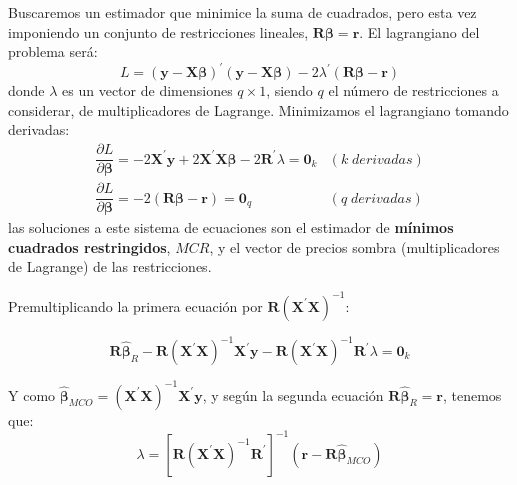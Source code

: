 Buscaremos un estimador que minimice la suma de cuadrados, pero esta
vez imponiendo un conjunto de restricciones lineales, $\boldsymbol{R}\boldsymbol{\beta}=\boldsymbol{r}$.
El lagrangiano del problema ser\'a:
\[
L=\left(\boldsymbol{y}-\boldsymbol{X}\boldsymbol{\beta}\right)^{\prime}\left(\boldsymbol{y}-\boldsymbol{X}\boldsymbol{\beta}\right)-2\lambda^{\prime}\left(\boldsymbol{R}\boldsymbol{\beta}-\boldsymbol{r}\right)
\]
 donde $\lambda$ es un vector de dimensiones $q\times1$, siendo
$q$ el n\'umero de restricciones a considerar, de multiplicadores de
Lagrange. Minimizamos el lagrangiano tomando derivadas:
\[
\begin{array}{cc}
\dfrac{\partial L}{\partial\boldsymbol{\beta}}=-2\boldsymbol{X}^{\prime}\boldsymbol{y}+2\boldsymbol{X}^{\prime}\boldsymbol{X}\boldsymbol{\beta}-2\boldsymbol{R}^{\prime}\lambda=\boldsymbol{0}_{k} & \left(k\;{\textstyle derivadas}\right)\\
\dfrac{\partial L}{\partial\boldsymbol{\beta}}=-2\left(\boldsymbol{R}\boldsymbol{\beta}-\boldsymbol{r}\right)=\boldsymbol{0}_{q} & \left(q\;{\textstyle derivadas}\right)
\end{array}
\]
 las soluciones a este sistema de ecuaciones son el estimador de \textbf{m\'inimos
cuadrados restringidos}, $MCR$, y el vector de precios sombra (multiplicadores
de Lagrange) de las restricciones.

Premultiplicando la primera ecuaci\'on por $\boldsymbol{R}\left(\boldsymbol{X}^{\prime}\boldsymbol{X}\right)^{-1}$:

\[
\boldsymbol{R}\hat{\boldsymbol{\beta}}_{R}-\boldsymbol{R}\left(\boldsymbol{X}^{\prime}\boldsymbol{X}\right)^{-1}\boldsymbol{X}^{\prime}\boldsymbol{y}-\boldsymbol{R}\left(\boldsymbol{X}^{\prime}\boldsymbol{X}\right)^{-1}\boldsymbol{R}^{\prime}\lambda=\boldsymbol{0}_{k}
\]


Y como $\hat{\boldsymbol{\beta}}_{MCO}=\left(\boldsymbol{X}^{\prime}\boldsymbol{X}\right)^{-1}\boldsymbol{X}^{\prime}\boldsymbol{y}$,
y seg\'un la segunda ecuaci\'on $\boldsymbol{R}\hat{\boldsymbol{\beta}}_{R}=\boldsymbol{r}$,
tenemos que:
\[
\lambda=\left[\boldsymbol{R}\left(\boldsymbol{X}^{\prime}\boldsymbol{X}\right)^{-1}\boldsymbol{R}^{\prime}\right]^{-1}\left(\boldsymbol{r}-\boldsymbol{R}\hat{\boldsymbol{\beta}}_{MCO}\right)
\]


